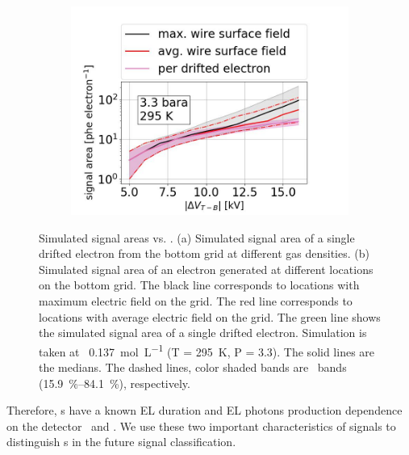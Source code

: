 \begin{figure}[!htbp]
\begin{subfigure}[b]{0.7\textwidth}
		\includegraphics[width=\figurewidth,clip,trim={0 0 0 0}]{Figures/GasTest/xenonProperties/MultiplicationPhotonCollectionNaiveProfileMeanSigma3300mbar.jpg}
		\caption{}
		\label{fig:photon per electron}
	\end{subfigure}
	\caption[Simulated signal areas vs. \opdv .]{Simulated signal areas vs. \opdv . (a) Simulated signal area of a single drifted electron from the bottom grid at different gas densities. (b) Simulated signal area of an electron generated at different locations on the bottom grid. The black line corresponds to locations with maximum electric field on the grid. The red line corresponds to locations with average electric field on the grid. The green line shows the simulated signal area of a single drifted electron. Simulation is taken at \opgd\ \SI{0.137}{\mole\per\liter} (T = \SI{295}{\kelvin}, P = \SI{3.3}{\bara}). The solid lines are the medians. The dashed lines, color shaded bands are \onesigma\ bands (\SIrange{15.9}{84.1}{\percent}), respectively.}
	\label{fig:photon per electron sim}
\end{figure}%

Therefore, \ees s  have a known EL duration and EL photons production dependence on the detector \opgd\ and \opdv . We use these two important characteristics of signals to distinguish \ees s in the future signal classification.

